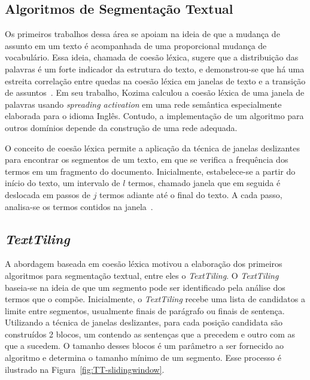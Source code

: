 
\subsection{Algoritmos de Segmentação Textual}


Os primeiros trabalhos dessa área se apoiam na ideia de que a mudança de assunto em um texto é acompanhada de uma proporcional mudança de vocabulário. Essa ideia, chamada de coesão léxica, sugere que a distribuição das palavras é um forte indicador da estrutura do texto, e demonstrou-se que há uma estreita correlação entre quedas na coesão léxica em janelas de texto e a transição de assuntos~\cite{Kozima1993}. Em seu trabalho, Kozima calculou a coesão léxica de uma janela de palavras usando \textit{spreading activation} em uma rede semântica especialmente elaborada para o idioma Inglês. Contudo, a implementação de um algoritmo para outros domínios depende da construção de uma rede adequada. 



O conceito de coesão léxica permite a aplicação da técnica de janelas deslizantes para encontrar os segmentos de um texto, em que se verifica a frequência dos termos em um fragmento do documento. Inicialmente, estabelece-se a partir do início do texto, um intervalo de $l$ termos, chamado janela que em seguida é deslocada em passos de $j$ termos adiante até o final do texto. A cada passo, analisa-se os termos contidos na janela~\cite{Reynar1998}.





\subsection*{\textit{TextTiling}}


A abordagem baseada em coesão léxica motivou a elaboração dos primeiros algoritmos para segmentação textual, entre eles o \textit{TextTiling}. O \textit{TextTiling} baseia-se na ideia de que um segmento pode ser identificado pela análise dos termos que o compõe. Inicialmente, o \textit{TextTiling} recebe uma lista de candidatos a limite entre segmentos, usualmente finais de parágrafo ou finais de sentença. Utilizando a técnica de janelas deslizantes, para cada posição candidata são construídos 2 blocos, um contendo as sentenças que a precedem e outro com as que a sucedem. O tamanho desses blocos é um parâmetro a ser fornecido ao algoritmo e determina o tamanho mínimo de um segmento. Esse processo é ilustrado na Figura~\ref{fig:TT-slidingwindow}.



